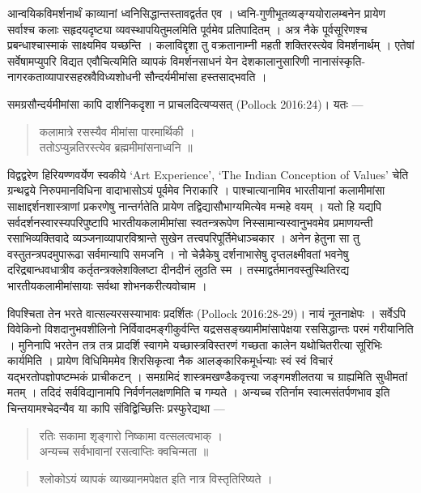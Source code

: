 {\dev आन्वयिकविमर्शनार्थं काव्यानां ध्वनिसिद्धान्तस्तावद्वर्तत एव । ध्वनि-गुणीभूतव्यङ्ग्ययोरालम्ब\-नेन प्रायेण सर्वाश्च कलाः सहृदयदृष्ट्या व्यवस्थापयितुमलमिति पूर्वमेव प्रतिपादितम् । अत्र नैके पूर्वसूरिणश्च प्रबन्धाश्चास्माकं साक्ष्यमिव यच्छन्ति । कलाविद्दृशा तु वक्रतानाम्नी महती शक्तिरस्त्येव विमर्शनार्थम् । एतेषां सर्वेषामप्युपरि विद्यत एवौचित्यमिति व्यापकं विमर्शन\-साधनं येन देशकालानुसारिणी नानासंस्कृति-नागरकताव्यापारसहस्रवैविध्यशोधनी सौन्दर्य\-मीमांसा हस्तसाद्भवति ।}

{\dev समग्रसौन्दर्यमीमांसा कापि दार्शनिकदृशा न प्राचलदित्यप्यसत्} (Pollock 2016:24){\dev । यतः ---}
\begin{quote}
{\dev कलामात्रे रसस्यैव मीमांसा पारमार्थिकी ।}\\
{\dev ततोऽप्युन्नतिरस्त्येव ब्रह्ममीमांसनाध्वनि ॥}
\end{quote}

{\dev विद्वद्वरेण हिरियण्णवर्येण स्वकीये} `Art Experience', `The Indian Conception of Values' {\dev चेति ग्रन्थद्वये निरुपमानविधिना वादाभासोऽयं पूर्वमेव निराकारि । पाश्चात्यानामिव भारतीयानां कलामीमांसा साक्षाद्दर्शनशास्त्राणां प्रकरणेषु नान्तर्गतेति प्रायेण तद्विद्यासौभाग्य\-मित्येव मन्महे वयम् । यतो हि यद्यपि सर्वदर्शनस्वारस्यपरिपुष्टापि भारतीयकलामीमांसा स्वतन्त्ररूपेण निस्सामान्यस्वानुभवमेव  प्रमाणयन्ती रसाभिव्यक्तिवादे व्यञ्जनाव्यापारविश्रान्ते सुखेन तत्त्वपरिपूर्तिमेधाञ्चकार । अनेन हेतुना सा तु वस्तुतन्त्रपदमुपारूढा सर्वमान्यापि सम\-जनि । नो चेन्नैकेषु दर्शनाभासेषु दृप्तलक्ष्मीवतां भवनेषु दरिद्रबान्धवधात्रीव कर्तृतन्त्रक्लेशक्लिष्टा दीनदीनं लुठति स्म । तस्माद्वर्तमानवस्तुस्थितिरद्य भारतीयकलामीमांसायाः सर्वथा शोभनकरीत्यवोचाम ।}

{\dev विपश्चिता तेन भरते वात्सल्यरसस्याभावः प्रदर्शितः} (Pollock 2016:28-29){\dev । नायं नूतना\-क्षेपः । सर्वेऽपि विवेकिनो विशदानुभवशीलिनो निर्विवादमङ्गीकुर्वन्ति यद्रससङ्ख्यामीमांसापेक्षया रससिद्धान्तः परमं गरीयानिति । मुनिनापि भरतेन तत्र तत्र प्रादर्शि स्वागमे यच्छास्त्रविस्तरणं गच्छता कालेन यथोचितरीत्या सूरिभिः कार्यमिति । प्रायेण विधिमिममेव शिरसिकृत्वा नैक आलङ्कारिकमूर्धन्याः स्वं स्वं विचारं यद्भरतोपज्ञोपष्टम्भकं प्राचीकटन् । समग्रमिदं शास्त्र\-मखण्डैकवृत्त्या जङ्गमशीलतया च ग्राह्यमिति सुधीमतां मतम् । तदिदं सर्वविद्यानामपि निर्व\-र्णनलक्षणमिति च गम्यते । अन्यच्च रतिर्नाम स्वात्मसंतर्पणभाव इति चिन्तयामश्चेदन्यैव या कापि संविद्विच्छित्तिः प्रस्फुरेद्यथा ---}
\begin{quote}
{\dev रतिः सकामा शृङ्गारो निष्कामा वत्सलत्वभाक् ।}\\
{\dev अन्यच्च सर्वभावानां रसत्वाप्तिः क्वचिन्मता ॥}
\end{quote}
\begin{quote}
{\dev श्लोकोऽयं व्यापकं व्याख्यानमपेक्षत इति नात्र विस्तृतिरिष्यते ।}
\end{quote}

